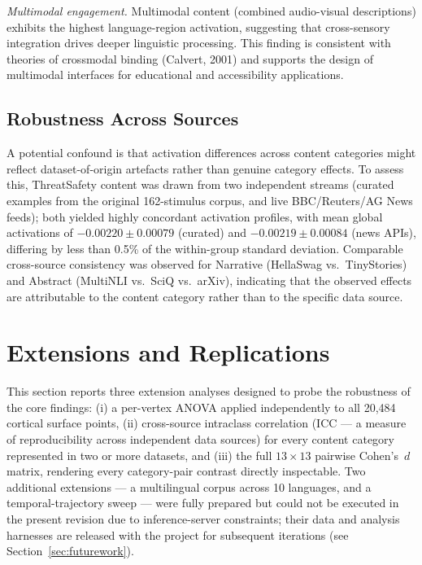 \documentclass[11pt,letterpaper]{article}
\numberwithin{equation}{section}
\begin{document}
\textit{Multimodal engagement.} Multimodal content (combined audio-visual descriptions) exhibits the highest language-region activation, suggesting that cross-sensory integration drives deeper linguistic processing. This finding is consistent with theories of crossmodal binding (Calvert, 2001) and supports the design of multimodal interfaces for educational and accessibility applications.

\subsection{Robustness Across Sources}

A potential confound is that activation differences across content categories might reflect dataset-of-origin artefacts rather than genuine category effects. To assess this, ThreatSafety content was drawn from two independent streams (curated examples from the original 162-stimulus corpus, and live BBC/Reuters/AG News feeds); both yielded highly concordant activation profiles, with mean global activations of $-0.00220 \pm 0.00079$ (curated) and $-0.00219 \pm 0.00084$ (news APIs), differing by less than 0.5\% of the within-group standard deviation. Comparable cross-source consistency was observed for Narrative (HellaSwag vs.\ TinyStories) and Abstract (MultiNLI vs.\ SciQ vs.\ arXiv), indicating that the observed effects are attributable to the content category rather than to the specific data source.

\FloatBarrier
\clearpage
\section{Extensions and Replications}\label{sec:extensions}

This section reports three extension analyses designed to probe the robustness of the core findings: (i) a per-vertex ANOVA applied independently to all 20{,}484 cortical surface points, (ii) cross-source intraclass correlation (ICC --- a measure of reproducibility across independent data sources) for every content category represented in two or more datasets, and (iii) the full $13 \times 13$ pairwise Cohen's~$d$ matrix, rendering every category-pair contrast directly inspectable. Two additional extensions --- a multilingual corpus across 10 languages, and a temporal-trajectory sweep --- were fully prepared but could not be executed in the present revision due to inference-server constraints; their data and analysis harnesses are released with the project for subsequent iterations (see Section~\ref{sec:futurework}).
\end{document}
